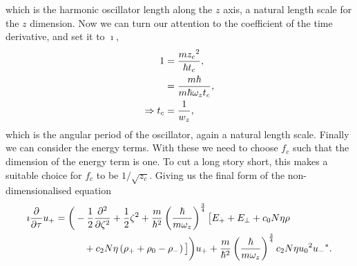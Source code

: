 which is the harmonic oscillator length along the $z$ axis, a natural length scale for the $z$ dimension. Now we can turn our attention to the coefficient of the time derivative, and set it to $\imath$,
\begin{align}
    1 &= \frac{m{z_c}^2}{\hbar t_c},\notag\\
      &= \frac{m \hbar}{m \hbar \omega_z t_c},\notag\\
    \Rightarrow t_c &= \frac{1}{w_z},
\end{align}
which is the angular period of the oscillator, again a natural length scale. Finally we can consider the energy terms. With these we need to choose $f_c$ such that the dimension of the energy term is one. To cut a long story short, this makes a suitable choice for $f_c$ to be $1/\sqrt{z_c}$. Giving us the final form of the non-dimensionalised equation
\begin{align}
    \imath\frac{\partial}{\partial \tau} u_{+} &= \bigg(-\frac{1}{2}\frac{\partial^2}{\partial \zeta^2} + \frac{1}{2}\zeta^2 + \frac{m}{\hbar^2}\left(\frac{\hbar}{m\omega_z}\right)^{\frac{3}{4}}\big[E_+ + E_\perp + c_0  N\eta\rho \notag \\
        &\quad \quad\quad + c_2 N\eta\left( \rho_+ + \rho_0 - \rho_- \right) \big]\bigg) u_+ + \frac{m}{\hbar^2}\left(\frac{\hbar}{m\omega_z}\right)^{\frac{3}{4}} c_2 N\eta{u_0}^2{u_-}^*.
\end{align}




